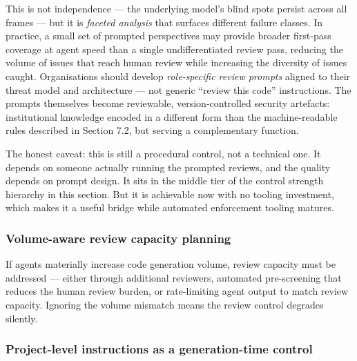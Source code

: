 \documentclass[a4paper,11pt]{report}
\begin{document}
This is not independence --- the underlying model's blind spots persist
across all frames --- but it is \emph{faceted analysis} that surfaces
different failure classes. In practice, a small set of prompted
perspectives may provide broader first-pass coverage at agent speed than
a single undifferentiated review pass, reducing the volume of issues
that reach human review while increasing the diversity of issues caught.
Organisations should develop \emph{role-specific review prompts} aligned
to their threat model and architecture --- not generic ``review this
code'' instructions. The prompts themselves become reviewable,
version-controlled security artefacts: institutional knowledge encoded
in a different form than the machine-readable rules described in Section
7.2, but serving a complementary function.

The honest caveat: this is still a procedural control, not a technical
one. It depends on someone actually running the prompted reviews, and
the quality depends on prompt design. It sits in the middle tier of the
control strength hierarchy in this section. But it is achievable now
with no tooling investment, which makes it a useful bridge while
automated enforcement tooling matures.

\hypertarget{volume-aware-review-capacity-planning}{%
\subsubsection{Volume-aware review capacity
planning}\label{volume-aware-review-capacity-planning}}

If agents materially increase code generation volume, review capacity
must be addressed --- either through additional reviewers, automated
pre-screening that reduces the human review burden, or rate-limiting
agent output to match review capacity. Ignoring the volume mismatch
means the review control degrades silently.

\hypertarget{project-level-instructions-as-a-generation-time-control}{%
\subsubsection{Project-level instructions as a generation-time
control}\label{project-level-instructions-as-a-generation-time-control}}
\end{document}
